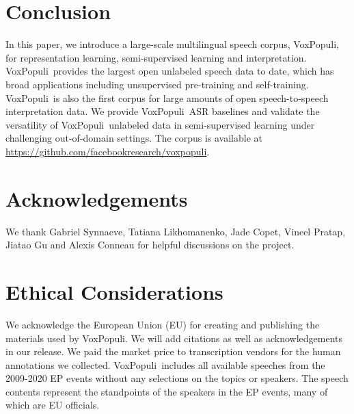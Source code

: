 \documentclass[11pt,a4paper]{article}
\newcommand{\vp}{VoxPopuli}
\begin{document}


\section{Conclusion}

In this paper, we introduce a large-scale multilingual speech corpus, \vp, for representation learning, semi-supervised learning and interpretation. \vp~provides the largest open unlabeled speech data to date, which has broad applications including unsupervised pre-training and self-training. \vp~is also the first corpus for large amounts of open speech-to-speech interpretation data.
We provide \vp~ASR baselines and validate the versatility of \vp~unlabeled data in semi-supervised learning under challenging out-of-domain settings. The corpus is available
at \url{https://github.com/facebookresearch/voxpopuli}.

\section{Acknowledgements}
We thank Gabriel Synnaeve, Tatiana Likhomanenko, Jade Copet, Vineel Pratap, Jiatao Gu and Alexis Conneau for helpful discussions on the project.

\section{Ethical Considerations}
We acknowledge the European Union (EU) for creating and publishing the materials used by \vp.
We will add citations as well as acknowledgements in our release.
We paid the market price to transcription vendors for the human annotations we collected. \vp~includes all available speeches from the 2009-2020 EP events without any selections on the topics or speakers. The speech contents represent the standpoints of the speakers in the EP events, many of which are EU officials.



\end{document}
